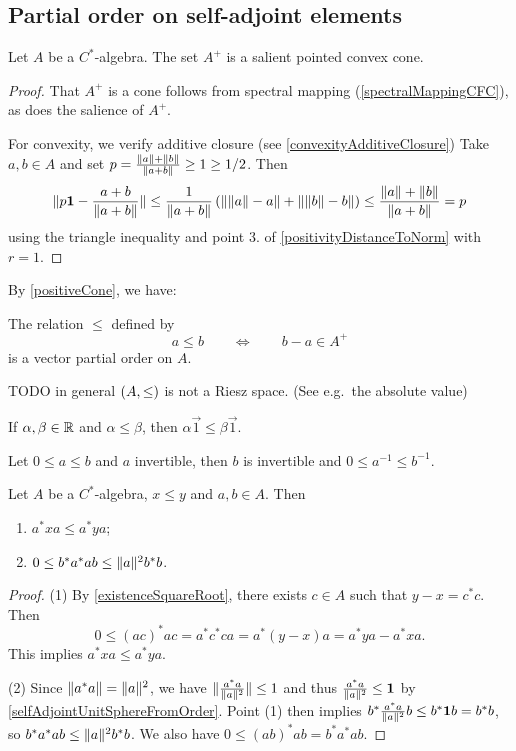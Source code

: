 \subsection{Partial order on self-adjoint elements}
\begin{proposition}
Let $A$ be a $C^*$-algebra. The set $A^+$ is a salient pointed convex cone.
\end{proposition}
\begin{proof}
That $A^+$ is a cone follows from spectral mapping (\ref{spectralMappingCFC}), as does the salience of $A^+$.

For convexity, we verify additive closure (see \ref{convexityAdditiveClosure}) Take $a,b\in A$ and set $p= \frac{\lVert a\rVert+\lVert b\rVert}{\lVert a+b\rVert} \geq 1 \geq 1/2$. Then
\[ \lVert p\boldsymbol{\mathrm{1}} - \frac{a+b}{\lVert a+b\rVert}\rVert \leq \frac{1}{\lVert a+b\rVert}\left(\lVert\lVert a\rVert-a\rVert + \lVert\lVert b\rVert-b\rVert\right) \leq \frac{\lVert a\rVert+\lVert b\rVert}{\lVert a+b\rVert} = p \]
using the triangle inequality and point 3. of \ref{positivityDistanceToNorm} with $r=1$.
\end{proof}
By \ref{positiveCone}, we have:
\begin{corollary}
The relation $\leq$ defined by
\[ a\leq b \qquad\iff\qquad b-a\in A^+ \]
is a vector partial order on $A$.
\end{corollary}
TODO in general $\sSet{A, \leq}$ is not a Riesz space. (See e.g.\ the absolute value)

\begin{lemma}
If $\alpha,\beta\in\mathbb{R}$ and $\alpha\leq \beta$, then $\alpha\vec{1}\leq \beta\vec{1}$.
\end{lemma}

\begin{lemma}
Let $0\leq a \leq b$ and $a$ invertible, then $b$ is invertible and $0\leq a^{-1}\leq b^{-1}$.
\end{lemma}

\begin{lemma} \label{CstarOrderLemma}
Let $A$ be a $C^*$-algebra, $x\leq y$ and $a,b\in A$. Then
\begin{enumerate}
\item $a^*xa \leq a^*ya$;
\item $0\leq b^*a^*ab \leq \lVert a\rVert^2b^*b$.
\end{enumerate}
\end{lemma}
\begin{proof}
(1) By \ref{existenceSquareRoot}, there exists $c\in A$ such that $y-x = c^*c$. Then
\[ 0 \leq (ac)^*ac = a^*c^*ca = a^*(y-x)a = a^*ya - a^*xa. \]
This implies $a^*xa \leq a^*ya$.

(2) Since $\lVert a^*a\rVert = \lVert a\rVert^2$, we have $\lVert\frac{a^*a}{\lVert a\rVert^2}\rVert \leq 1$ and thus $\frac{a^*a}{\lVert a\rVert^2} \leq \boldsymbol{\mathrm{1}}$ by \ref{selfAdjointUnitSphereFromOrder}. Point (1) then implies $b^*\frac{a^*a}{\lVert a\rVert^2}b \leq b^*\boldsymbol{\mathrm{1}}b = b^*b$, so $b^*a^*ab \leq \lVert a\rVert^2b^*b$. We also have $0\leq (ab)^*ab = b^*a^*ab$.
\end{proof}


